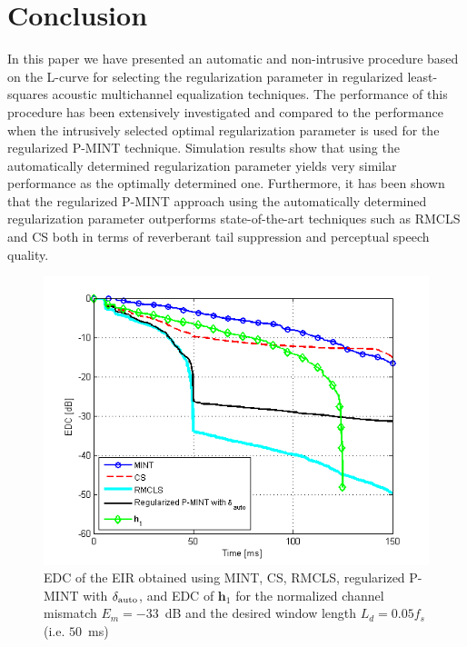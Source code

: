 \documentclass{article}
\begin{document}
\section{Conclusion}
In this paper we have presented an automatic and non-intrusive procedure based on the L-curve for selecting the regularization parameter in regularized least-squares acoustic multichannel equalization techniques. 
The performance of this procedure has been extensively investigated and compared to the performance when the intrusively selected optimal regularization parameter is used for the regularized P-MINT technique.
Simulation results show that using the automatically determined regularization parameter yields very similar performance as the optimally determined one. 
Furthermore, it has been shown that the regularized P-MINT approach using the automatically determined regularization parameter outperforms state-of-the-art techniques such as RMCLS and CS both in terms of reverberant tail suppression and perceptual speech quality.
\begin{figure}[t!]
\centering
\includegraphics[scale = 0.6]{Plots/EDC_all_sys_5_Cm_-33_Ld_800}
\caption{EDC of the EIR obtained using MINT, CS, RMCLS, regularized P-MINT with $\delta_{\rm auto}$, and EDC of $\mathbf{h}_1$ for the normalized channel mismatch $E_m = -33$~dB and the desired window length $L_d = 0.05f_s$ (i.e. $50$~ms)}
\label{fig: edcall}
\end{figure}


\end{document}

